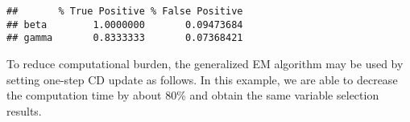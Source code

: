 \begin{Shaded}
\begin{Highlighting}[]
\StringTok{ }
\StringTok{ }
        \NormalTok{(}\NormalTok{ =}\StringTok{ }\NormalTok{(b[b0 }\OperatorTok{!=}\StringTok{ }\NormalTok{] }\OperatorTok{!=}\StringTok{ }\NormalTok{),}
          \NormalTok{ =}\StringTok{ }\NormalTok{(b[b0 }\OperatorTok{==}\StringTok{ }\NormalTok{] }\OperatorTok{!=}\StringTok{ }\NormalTok{))}
\NormalTok{    \}}
    \NormalTok{(} \NormalTok{(}\OperatorTok{$}
           \NormalTok{(}\OperatorTok{$}
\NormalTok{\}}
\end{Highlighting}
\end{Shaded}

\begin{verbatim}
##       % True Positive % False Positive
## beta        1.0000000       0.09473684
## gamma       0.8333333       0.07368421
\end{verbatim}

To reduce computational burden, the generalized EM algorithm may be used
by setting one-step CD update as follows. In this example, we are able
to decrease the computation time by about 80\% and obtain the same
variable selection results.

\begin{Shaded}
\begin{Highlighting}[]
\NormalTok{(\{}
\StringTok{ }\NormalTok{(}
        \OperatorTok{$}\OperatorTok{$}
         \NormalTok{, } \NormalTok{,}
         \NormalTok{, } \NormalTok{,}
         \NormalTok{, } 
\NormalTok{    )}
\NormalTok{\})}
\end{Highlighting}
\end{Shaded}

